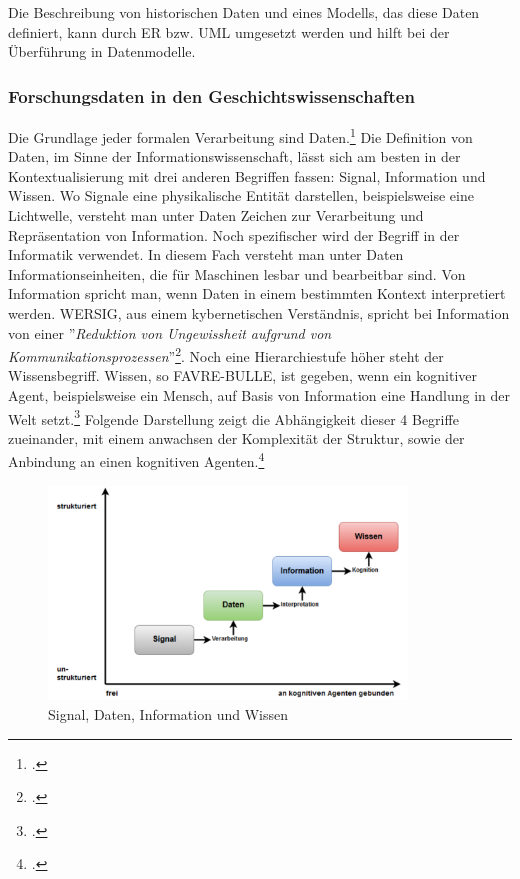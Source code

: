 \documentclass[12pt,a4paper]{article}
\begin{document}
Die Beschreibung von historischen Daten und eines Modells, das diese Daten definiert, kann durch ER bzw. UML umgesetzt werden und hilft bei der Überführung in Datenmodelle. 
\subsubsection{Forschungsdaten in den Geschichtswissenschaften}
\label{forschungdaten}

Die Grundlage jeder formalen Verarbeitung sind Daten.\footcite[Ausführlich habe ich mich mit den theoretischen Grundlagen der Informationswissenschaft, Daten - Information - Wissen, in folgender Arbeit auseinander gesetzt:][]{pollin2017suchen} Die Definition von Daten, im Sinne der Informationswissenschaft, lässt sich am besten in der Kontextualisierung mit drei anderen Begriffen fassen: Signal, Information und Wissen. Wo Signale eine physikalische Entität darstellen, beispielsweise eine Lichtwelle, versteht man unter Daten Zeichen zur Verarbeitung und Repräsentation von Information. Noch spezifischer wird der Begriff in der Informatik verwendet. In diesem Fach versteht man unter Daten Informationseinheiten, die für Maschinen lesbar und bearbeitbar sind. Von Information spricht man, wenn Daten in einem bestimmten Kontext interpretiert werden. WERSIG, aus einem kybernetischen Verständnis, spricht bei Information von einer ''\textit{Reduktion von Ungewissheit aufgrund von Kommunikationsprozessen}''\footcite[][S.74]{wersig1971information}. Noch eine Hierarchiestufe höher steht der Wissensbegriff. Wissen, so FAVRE-BULLE, ist gegeben, wenn ein kognitiver Agent, beispielsweise ein Mensch, auf Basis von Information eine Handlung in der Welt setzt.\footcite[][S.93-97]{favre2001information} Folgende Darstellung zeigt die Abhängigkeit dieser 4 Begriffe zueinander, mit einem anwachsen der Komplexität der Struktur, sowie der Anbindung an einen kognitiven Agenten.\footcite[Eine ausführlichere Auseinandersetzung mit den Begriffen Daten, Information und Wissen findet sich in meiner ersten Abschlussarbeit.][Masterarbeit Graz, S.20-28]{pollin2017suchen}
\begin{figure}[H]
\centering
	\includegraphics[width=0.85\textwidth]{img/daten.png}  
    \caption[Signal, Daten, Information und Wissen. POLLIN Christopher: Vom Suchen, Stöbern und Finden : Information Retrieval am Beispiel der Digitalen Sammlung des Hans Gross Kriminalmuseums, Masterarbeit Graz, S.21 ]{Signal, Daten, Information und Wissen} \label{fig:daten}
\end{figure} 
\end{document}
